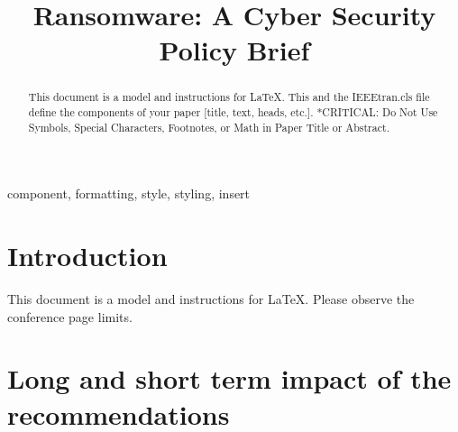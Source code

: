 \documentclass[conference]{IEEEtran}
\begin{document}
\title{Ransomware: A Cyber Security Policy Brief}

\author{
\and
{}
\and
{}
\and
{}
}

\maketitle

\begin{abstract}
This document is a model and instructions for \LaTeX.
This and the IEEEtran.cls file define the components of your paper [title, text, heads, etc.]. *CRITICAL: Do Not Use Symbols, Special Characters, Footnotes, 
or Math in Paper Title or Abstract.
\end{abstract}

\begin{IEEEkeywords}
component, formatting, style, styling, insert
\end{IEEEkeywords}

\section{Introduction}
This document is a model and instructions for \LaTeX.
Please observe the conference page limits. 

\section{Long and short term impact of the recommendations}
\end{document}
